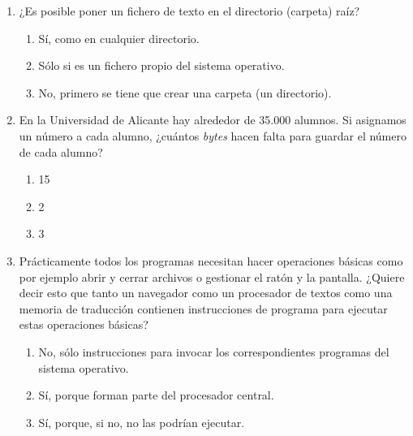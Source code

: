 \begin{enumerate}
\item ¿Es posible poner un fichero de texto en el directorio (carpeta) raíz? \begin{enumerate} \item Sí, como en cualquier directorio. \item Sólo si es un fichero propio del sistema operativo. \item No, primero se tiene que crear una carpeta (un directorio). \end{enumerate} 

\item En la Universidad de Alicante hay alrededor de 35.000 alumnos. Si asignamos un número a cada alumno, ¿cuántos \emph{bytes} hacen falta para guardar el número de cada alumno? \begin{enumerate} \item 15 \item 2 \item 3 \end{enumerate} 

\item Prácticamente todos los programas necesitan hacer operaciones básicas como por ejemplo abrir y cerrar archivos o gestionar el ratón y la pantalla. ¿Quiere decir esto que tanto un navegador como un procesador de textos como una memoria de traducción contienen instrucciones de programa para ejecutar estas operaciones básicas? \begin{enumerate} \item No, sólo instrucciones para invocar los correspondientes programas del sistema operativo. \item Sí, porque forman parte del procesador central. \item Sí, porque, si no, no las podrían ejecutar. \end{enumerate} 


\end{enumerate}
